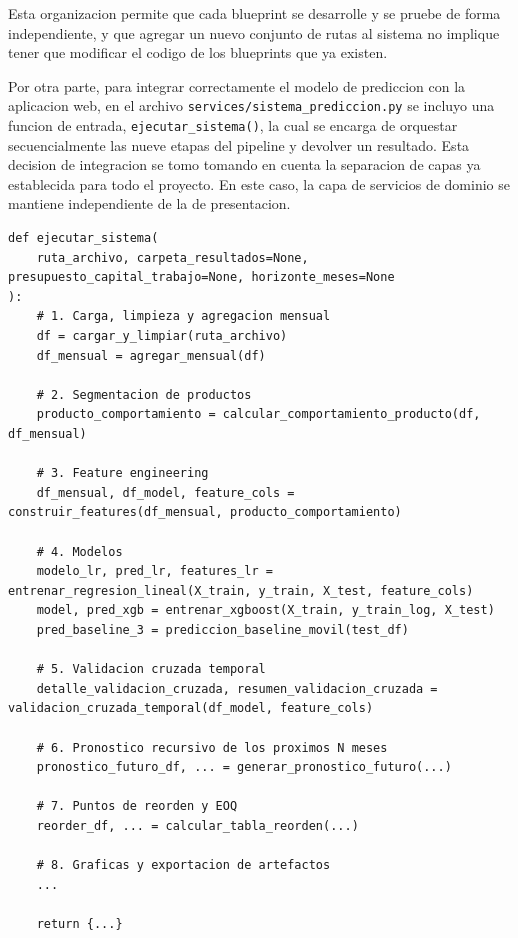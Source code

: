 Esta organizacion permite que cada blueprint se desarrolle y se pruebe de forma independiente, y que agregar un nuevo conjunto de rutas al sistema no implique tener que modificar el codigo de los blueprints que ya existen.

Por otra parte, para integrar correctamente el modelo de prediccion con la aplicacion web, en el archivo \texttt{services/sistema\_prediccion.py} se incluyo una funcion de entrada, \texttt{ejecutar\_sistema()}, la cual se encarga de orquestar secuencialmente las nueve etapas del pipeline y devolver un resultado. Esta decision de integracion se tomo tomando en cuenta la separacion de capas ya establecida para todo el proyecto. En este caso, la capa de servicios de dominio se mantiene independiente de la de presentacion.

\label{lst:ejecutar_sistema}
\begin{verbatim}
def ejecutar_sistema(
    ruta_archivo, carpeta_resultados=None, presupuesto_capital_trabajo=None, horizonte_meses=None
):
    # 1. Carga, limpieza y agregacion mensual 
    df = cargar_y_limpiar(ruta_archivo)
    df_mensual = agregar_mensual(df)

    # 2. Segmentacion de productos
    producto_comportamiento = calcular_comportamiento_producto(df, df_mensual)

    # 3. Feature engineering
    df_mensual, df_model, feature_cols = construir_features(df_mensual, producto_comportamiento)

    # 4. Modelos
    modelo_lr, pred_lr, features_lr = entrenar_regresion_lineal(X_train, y_train, X_test, feature_cols)
    model, pred_xgb = entrenar_xgboost(X_train, y_train_log, X_test)
    pred_baseline_3 = prediccion_baseline_movil(test_df)

    # 5. Validacion cruzada temporal
    detalle_validacion_cruzada, resumen_validacion_cruzada = validacion_cruzada_temporal(df_model, feature_cols)

    # 6. Pronostico recursivo de los proximos N meses
    pronostico_futuro_df, ... = generar_pronostico_futuro(...)

    # 7. Puntos de reorden y EOQ
    reorder_df, ... = calcular_tabla_reorden(...)

    # 8. Graficas y exportacion de artefactos
    ...

    return {...}
\end{verbatim}


